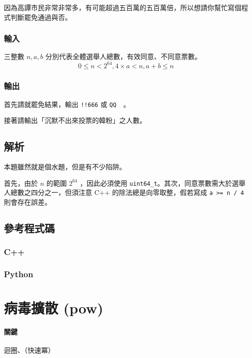 \documentclass[a4paper,10pt]{article}
\begin{document}
因為高譚市民非常非常多，有可能超過五百萬的五百萬倍，所以想請你幫忙寫個程式判斷罷免通過與否。

\subsubsection{輸入}

三整數 $n, a, b$ 分別代表全體選舉人總數，有效同意、不同意票數。$$0 \leq n < 2^{64}, 4 \times a < n, a + b \leq n$$

\subsubsection{輸出}

首先請就罷免結果，輸出 \texttt{!!666} 或 \texttt{QQ~~}。

接著請輸出「沉默不出來投票的韓粉」之人數。

\subsection{解析}

本題雖然就是個水題，但是有不少陷阱。

首先，由於 $n$ 的範圍 $2^{64}$ ，因此必須使用 \texttt{uint64\_t}。其次，同意票數需大於選舉人總數之四分之一，但須注意 C++ 的除法總是向零取整，假若寫成 \texttt{a >= n / 4} 則會存在誤差。

\subsection{參考程式碼}

\subsubsection{C++}



\subsubsection{Python}



\section{病毒擴散 (pow)}

\paragraph{關鍵} 迴圈、（快速冪）
\end{document}
